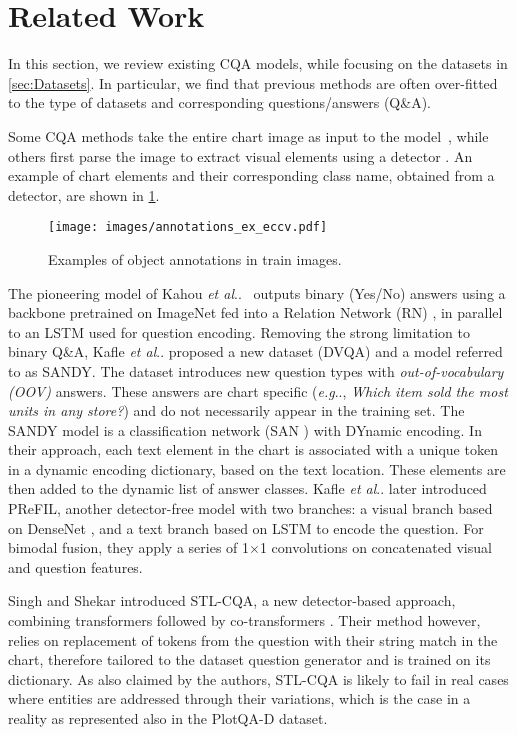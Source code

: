 \documentclass[runningheads]{llncs}
\makeatletter
\DeclareRobustCommand\onedot{\futurelet\@let@token\@onedot}
\def\@onedot{\ifx\@let@token.\else.\null\fi\xspace}
\def\eg{\emph{e.g}\onedot} \def\Eg{\emph{E.g}\onedot}
\def\etal{\emph{et al}\onedot}
\makeatother
\begin{document}
\section{Related Work}
\label{sec:related}

In this section, we review existing CQA models, while focusing on the datasets in \cref{sec:Datasets}. In particular, we find that previous methods are often over-fitted to the type of datasets and corresponding questions/answers (Q\&A).

Some CQA methods take the entire chart image as input to the model~\cite{figureqa, dvqa, prefil}, while others
first parse the image to extract visual elements using a detector \cite{plotqa, chartqa, chaudhry2019leafqa}. An example of chart elements and their corresponding class name, obtained from a detector, are shown in  \cref{fig:visual_elements_names}.
\begin{figure}[t]
\begin{center}
   \texttt{[image: images/annotations\_ex\_eccv.pdf]}
\end{center}
   \caption{Examples of object annotations in train images.} \label{fig:visual_elements_names}
\end{figure}

The pioneering model of Kahou \etal~\cite{figureqa} outputs binary (Yes/No) answers using a backbone pretrained on ImageNet fed into a Relation Network (RN) \cite{SantoroRBMPBL17}, in parallel to an LSTM \cite{lstm} used for question encoding. Removing the strong limitation to binary Q\&A, Kafle \etal \cite{dvqa} proposed a new dataset (DVQA) and a model referred to as SANDY. The dataset introduces new question types with \emph{out-of-vocabulary (OOV)} answers. These answers are chart specific (\eg, {\it Which item sold the most units in any store?}) and do not necessarily appear in the training set. The SANDY model is a classification network (SAN \cite{yang2016stacked}) with DYnamic encoding. In their approach, each text element in the chart is associated with a unique token in a dynamic encoding dictionary, based on the text location. These elements are then added to the dynamic list of answer classes. Kafle \etal\cite{prefil} later introduced PReFIL, another detector-free model with two branches: a visual branch based on DenseNet \cite{densenet}, and a text branch based on LSTM to encode the question. For bimodal fusion, they apply a series of 1$\times$1 convolutions on concatenated visual and question features.

Singh and Shekar \cite{chartqa} introduced STL-CQA, a new detector-based approach, combining transformers followed by co-transformers \cite{neuralMachineTranslation_ICLR15}.
Their method however, relies on replacement of tokens from the question with their string match in the chart, therefore tailored to the dataset question generator and is trained on its dictionary. As also claimed by the authors, STL-CQA is likely to fail in real cases where entities are addressed through their variations, which is the case in a reality as represented also in the PlotQA-D dataset.
\end{document}
